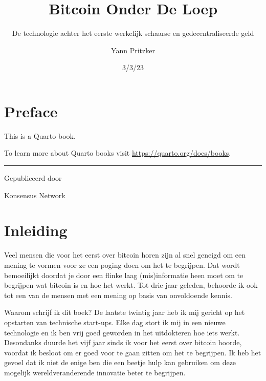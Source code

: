 \documentclass[
  letterpaper,
]{scrbook}
\title{Bitcoin Onder De Loep}
\subtitle{De technologie achter het eerste werkelijk schaarse en
gedecentraliseerde geld}
\author{Yann Pritzker}
\date{3/3/23}
\renewcommand*\contentsname{Table of contents}
\newcommand\contentsname{Table of contents}
\begin{document}
\frontmatter
\maketitle
\ifdefined\Shaded\renewenvironment{Shaded}{\begin{tcolorbox}[sharp corners, boxrule=0pt, enhanced, interior hidden, breakable, borderline west={3pt}{0pt}{shadecolor}, frame hidden]}{\end{tcolorbox}}\fi

\renewcommand*\contentsname{Inhoudsopgave}
{
\hypersetup{linkcolor=}
\setcounter{tocdepth}{2}
\tableofcontents
}
\mainmatter
{}

\hypertarget{preface}{%
\chapter*{Preface}\label{preface}}


This is a Quarto book.

To learn more about Quarto books visit
\url{https://quarto.org/docs/books}.

\begin{center}\rule{0.5\linewidth}{0.5pt}\end{center}

Gepubliceerd door

Konsensus Network


\hypertarget{inleiding}{%
\chapter{Inleiding}\label{inleiding}}

Veel mensen die voor het eerst over bitcoin horen zijn al snel geneigd
om een mening te vormen voor ze een poging doen om het te begrijpen. Dat
wordt bemoeilijkt doordat je door een flinke laag (mis)informatie heen
moet om te begrijpen wat bitcoin is en hoe het werkt. Tot drie jaar
geleden, behoorde ik ook tot een van de mensen met een mening op basis
van onvoldoende kennis.

Waarom schrijf ik dit boek? De laatste twintig jaar heb ik mij gericht
op het opstarten van technische start-ups. Elke dag stort ik mij in een
nieuwe technologie en ik ben vrij goed geworden in het uitdokteren hoe
iets werkt. Desondanks duurde het vijf jaar sinds ik voor het eerst over
bitcoin hoorde, voordat ik besloot om er goed voor te gaan zitten om het
te begrijpen. Ik heb het gevoel dat ik niet de enige ben die een beetje
hulp kan gebruiken om deze mogelijk wereldveranderende innovatie beter
te begrijpen.
\end{document}
